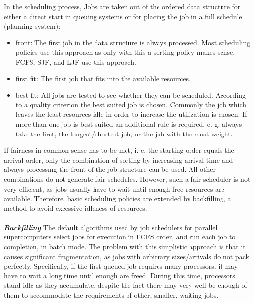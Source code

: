 In the scheduling process, Jobs are taken out of the ordered data structure for either a direct start in queuing systems or for placing the job in a full schedule (planning system):
\begin{itemize}
\item front: The first job in the data structure is always processed. Most scheduling policies use this approach as only with this a sorting policy makes sense. FCFS, SJF, and LJF use this approach.
\item first fit: The first job that fits into the available resources.
\item best fit: All jobs are tested to see whether they can be scheduled. According to a quality criterion the best suited job is chosen. Commonly the job which leaves the least resources idle in order to increase the utilization is chosen. If more than one job is best suited an additional rule is required, e. g. always take the first, the longest/shortest job, or the job with the most weight.
\end{itemize}
If fairness in common sense has to be met, i. e. the starting order equals the arrival order, only the combination of sorting by increasing arrival time and always processing the front of the job structure can be used. All other combinations do not generate fair schedules. However, such a fair scheduler is not very efficient, as jobs usually have to wait until enough free resources are available. Therefore, basic scheduling policies are extended by backfilling, a method to avoid excessive idleness of resources.\\ \\
\textbf{\textit{Backfilling }}The default algorithms used by job schedulers for parallel supercomputers select jobs for execution in FCFS order, and run each job to completion, in batch mode. The problem with this simplistic approach is that it causes significant fragmentation, as jobs with arbitrary sizes/arrivals do not pack perfectly. Specifically, if the first queued job requires many processors, it may have to wait a long time until enough are freed. During this time, processors stand idle as they accumulate, despite the fact there may very well be enough of them to accommodate the requirements of other, smaller, waiting jobs.\\ \\
